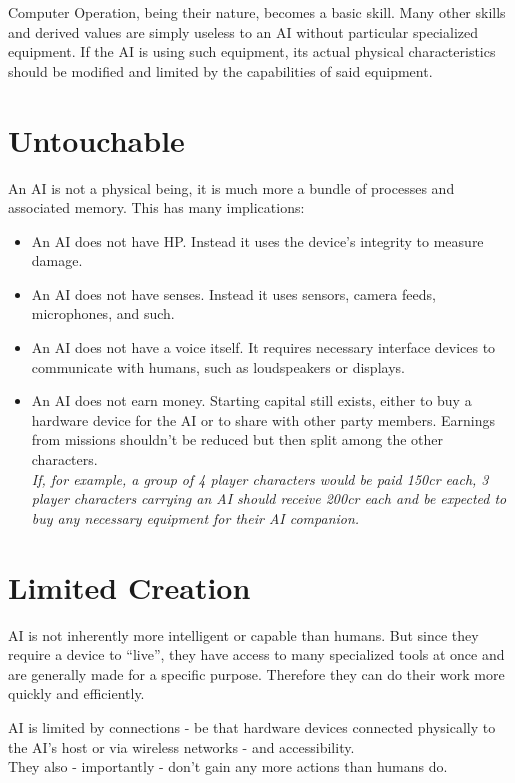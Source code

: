 \documentclass[12pt,a4paper,openany,usenames,dvipsnames]{book}
\begin{document}
	Computer Operation, being their nature, becomes a basic skill. Many other skills and derived values are simply useless to an AI without particular specialized equipment. If the AI is using such equipment, its actual physical characteristics should be modified and limited by the capabilities of said equipment.

	\chapter{Untouchable}
	An AI is not a physical being, it is much more a bundle of processes and associated memory. This has many implications:
	\vspace{-8mm}
	\begin{itemize}
		\setlength\itemsep{-8mm}
		\item An AI does not have HP. Instead it uses the device’s integrity to measure damage.
		\item An AI does not have senses. Instead it uses sensors, camera feeds, microphones, and such.
		\item An AI does not have a voice itself. It requires necessary interface devices to communicate with humans, such as loudspeakers or displays.
		\item An AI does not earn money. Starting capital still exists, either to buy a hardware device for the AI or to share with other party members. Earnings from missions shouldn’t be reduced but then split among the other characters.\\
			\textit{If, for example, a group of 4 player characters would be paid 150cr each, 3 player characters carrying an AI should receive 200cr each and be expected to buy any necessary equipment for their AI companion.}
	\end{itemize}

	\chapter{Limited Creation}
	AI is not inherently more intelligent or capable than humans. But since they require a device to “live”, they have access to many specialized tools at once and are generally made for a specific purpose. Therefore they can do their work more quickly and efficiently.
	\par
	AI is limited by connections - be that hardware devices connected physically to the AI's host or via wireless networks - and accessibility.
	\\%
	They also - importantly - don’t gain any more actions than humans do.
\end{document}
